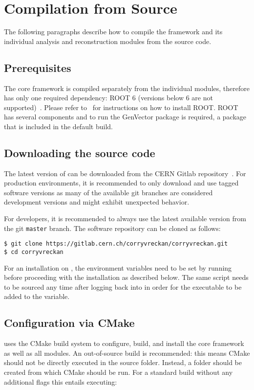 \section{Compilation from Source}

The following paragraphs describe how to compile the \corry framework and its individual analysis and reconstruction modules from the source code.

\subsection{Prerequisites}
\label{sec:prerequisites}
The core framework is compiled separately from the individual modules, therefore \corry has only one required dependency: ROOT 6 (versions below 6 are not supported)~\cite{root}.
Please refer to~\cite{rootinstallation} for instructions on how to install ROOT.
ROOT has several components and to run \corry the GenVector package is required, a package that is included in the default build.

\subsection{Downloading the source code}
The latest version of \corry can be downloaded from the CERN Gitlab repository~\cite{corry-repo}.
For production environments, it is recommended to only download and use tagged software versions as many of the available git branches are considered development versions and might exhibit unexpected behavior.

For developers, it is recommended to always use the latest available version from the git \texttt{master} branch.
The software repository can be cloned as follows:

\begin{verbatim}
$ git clone https://gitlab.cern.ch/corryvreckan/corryvreckan.git
$ cd corryvreckan
\end{verbatim}

For an installation on , the environment variables need to be set by running  before proceeding with the installation as described below.
The same script needs to be sourced any time after logging back into  in order for the  executable to be added to the  variable.

\subsection{Configuration via CMake}
\label{sec:cmake_config}
\corry uses the CMake build system to configure, build, and install the core framework as well as all modules.
An out-of-source build is recommended: this means CMake should not be directly executed in the source folder.
Instead, a  folder should be created from which CMake should be run.
For a standard build without any additional flags this entails executing:

